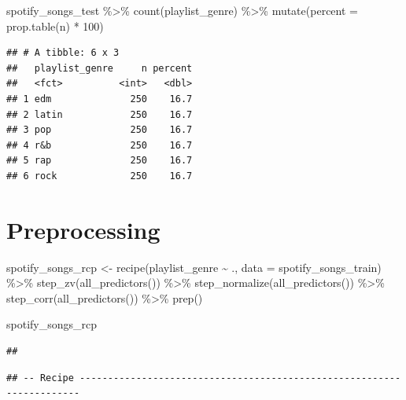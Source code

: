 \documentclass[
]{article}
\newenvironment{Shaded}{\begin{snugshade}}{\end{snugshade}}
\newcommand{\AttributeTok}[1]{\textcolor[rgb]{0.77,0.63,0.00}{#1}}
\newcommand{\DecValTok}[1]{\textcolor[rgb]{0.00,0.00,0.81}{#1}}
\newcommand{\FunctionTok}[1]{\textcolor[rgb]{0.00,0.00,0.00}{#1}}
\newcommand{\NormalTok}[1]{#1}
\newcommand{\OtherTok}[1]{\textcolor[rgb]{0.56,0.35,0.01}{#1}}
\newcommand{\SpecialCharTok}[1]{\textcolor[rgb]{0.00,0.00,0.00}{#1}}
\begin{document}
\begin{Shaded}
\begin{Highlighting}[]
\NormalTok{spotify\_songs\_test }\SpecialCharTok{\%\textgreater{}\%} \FunctionTok{count}\NormalTok{(playlist\_genre)  }\SpecialCharTok{\%\textgreater{}\%}
  \FunctionTok{mutate}\NormalTok{(}\AttributeTok{percent =} \FunctionTok{prop.table}\NormalTok{(n) }\SpecialCharTok{*} \DecValTok{100}\NormalTok{)}
\end{Highlighting}
\end{Shaded}

\begin{verbatim}
## # A tibble: 6 x 3
##   playlist_genre     n percent
##   <fct>          <int>   <dbl>
## 1 edm              250    16.7
## 2 latin            250    16.7
## 3 pop              250    16.7
## 4 r&b              250    16.7
## 5 rap              250    16.7
## 6 rock             250    16.7
\end{verbatim}

\hypertarget{preprocessing}{%
\section{Preprocessing}\label{preprocessing}}

\begin{Shaded}
\begin{Highlighting}[]
\NormalTok{spotify\_songs\_rcp }\OtherTok{\textless{}{-}} \FunctionTok{recipe}\NormalTok{(playlist\_genre }\SpecialCharTok{\textasciitilde{}}\NormalTok{ ., }\AttributeTok{data =}\NormalTok{ spotify\_songs\_train) }\SpecialCharTok{\%\textgreater{}\%}
  \FunctionTok{step\_zv}\NormalTok{(}\FunctionTok{all\_predictors}\NormalTok{()) }\SpecialCharTok{\%\textgreater{}\%} 
  \FunctionTok{step\_normalize}\NormalTok{(}\FunctionTok{all\_predictors}\NormalTok{()) }\SpecialCharTok{\%\textgreater{}\%} 
  \FunctionTok{step\_corr}\NormalTok{(}\FunctionTok{all\_predictors}\NormalTok{()) }\SpecialCharTok{\%\textgreater{}\%} 
  \FunctionTok{prep}\NormalTok{()}

\NormalTok{spotify\_songs\_rcp}
\end{Highlighting}
\end{Shaded}

\begin{verbatim}
## 
\end{verbatim}

\begin{verbatim}
## -- Recipe ----------------------------------------------------------------------
\end{verbatim}
\end{document}
